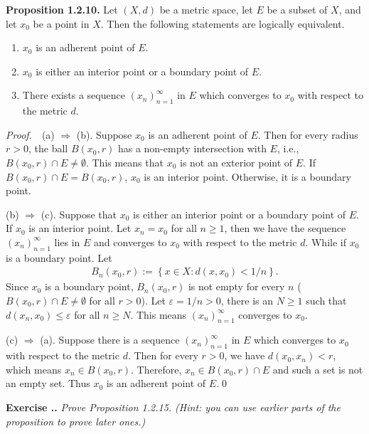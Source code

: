 \documentclass{book}
\newcommand{\pff}{\vspace{.25em}\noindent\emph{Proof.}~~}
\newcommand{\titl}[1]{\noindent\textbf{#1}}
\newcounter{Exercise}[section]
\renewcommand{\theExercise}{\thesection.\arabic{Exercise}.}
\newcommand{\new}{\vspace{1.5em}\noindent\textbf{Exercise \stepcounter{Exercise}\textbf{\theExercise}} }
\begin{document}
\begin{framed}
    \titl{Proposition 1.2.10.} Let $(X,d)$ be a metric space, let $E$ be a subset of $X$, and let $x_0$ be a point in $X$. Then the following statements are logically equivalent.
    \begin{enumerate}
        \item $x_0$ is an adherent point of $E$.
        \item $x_0$ is either an interior point or a boundary point of $E$.
        \item There exists a sequence $(x_n)_{n=1}^{\infty}$ in $E$ which converges to $x_0$ with respect to the metric $d$.
    \end{enumerate}
\end{framed}

\pff (a) $\Rightarrow$ (b). Suppose $x_0$ is an adherent point of $E$. Then for every radius $r>0$, the ball $B(x_0,r)$ has a non-empty intersection with $E$, i.e., $B(x_0,r)\cap E\neq\emptyset$. This means that $x_0$ is not an exterior point of $E$. If $B(x_0,r)\cap E=B(x_0,r)$, $x_0$ is an interior point. Otherwise, it is a boundary point.

(b) $\Rightarrow$ (c). Suppose that $x_0$ is either an interior point or a boundary point of $E$. If $x_0$ is an interior point. Let $x_n=x_0$ for all $n\geq 1$, then we have the sequence $(x_n)_{n=1}^{\infty}$ lies in $E$ and converges to $x_0$ with respect to the metric $d$. While if $x_0$ is a boundary point. Let
    \begin{align*}
        B_n(x_0,r):=\left\{x\in X:d(x,x_0)<1/n\right\}.
    \end{align*}
Since $x_0$ is a boundary point, $B_n(x_0,r)$ is not empty for every $n$ ($B(x_0,r)\cap E\neq\emptyset$ for all $r>0$). Let $\varepsilon=1/n>0$, there is an $N\geq 1$ such that $d(x_n,x_0)\leq\varepsilon$ for all $n\geq N$. This means $(x_n)_{n=1}^{\infty}$ converges to $x_0$.

(c) $\Rightarrow$ (a). Suppose there is a sequence $(x_n)_{n=1}^{\infty}$ in $E$ which converges to $x_0$ with respect to the metric $d$. Then for every $r>0$, we have $d(x_0,x_n)<r$, which means $x_n\in B(x_0,r)$. Therefore, $x_n\in B(x_0,r)\cap E$ and such a set is not an empty set. Thus $x_0$ is an adherent point of $E$.\qed

\new\emph{Prove Proposition 1.2.15. (Hint: you can use earlier parts of the proposition to prove later ones.)}
\end{document}
